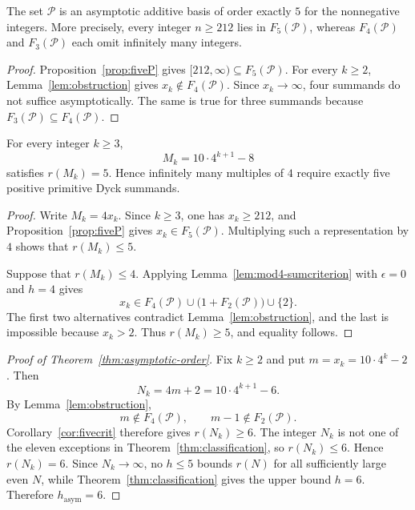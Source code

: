 \documentclass{ws-ijfcs}
\newcommand{\Pset}{\mathcal P}
\begin{document}
\begin{corollary}[Order of $\Pset$]\label{cor:orderfive}
The set $\Pset$ is an asymptotic additive basis of order exactly $5$ for
the nonnegative integers.  More precisely, every integer $n\geq212$ lies
in $F_5(\Pset)$, whereas $F_4(\Pset)$ and $F_3(\Pset)$ each omit
infinitely many integers.
\end{corollary}

\begin{proof}
Proposition~\ref{prop:fiveP} gives
$[212,\infty)\subseteq F_5(\Pset)$.  For every $k\geq2$,
Lemma~\ref{lem:obstruction} gives $x_k\notin F_4(\Pset)$.  Since
$x_k\to\infty$, four summands do not suffice asymptotically.  The same is
true for three summands because $F_3(\Pset)\subseteq F_4(\Pset)$.
\end{proof}

\newpage
\begin{corollary}
\label{cor:five-multiples}
For every integer $k\geq3$,
\[
 M_k=10\cdot4^{k+1}-8
\]
satisfies $r(M_k)=5$.  Hence infinitely many multiples of $4$ require
exactly five positive primitive Dyck summands.
\end{corollary}

\begin{proof}
Write $M_k=4x_k$.  Since $k\geq3$, one has $x_k\geq212$, and
Proposition~\ref{prop:fiveP} gives $x_k\in F_5(\Pset)$.  Multiplying such
a representation by $4$ shows that $r(M_k)\leq5$.

Suppose that $r(M_k)\leq4$.  Applying
Lemma~\ref{lem:mod4-sumcriterion} with $\epsilon=0$ and $h=4$ gives
\[
 x_k\in
 F_4(\Pset)
 \cup\bigl(1+F_2(\Pset)\bigr)
 \cup\{2\}.
\]
The first two alternatives contradict Lemma~\ref{lem:obstruction}, and
the last is impossible because $x_k>2$.  Thus $r(M_k)\geq5$, and equality
follows.
\end{proof}

\begin{proof}[Proof of Theorem~\ref{thm:asymptotic-order}]
Fix $k\geq2$ and put $m=x_k=10\cdot4^k-2$.  Then
\[
 N_k=4m+2=10\cdot4^{k+1}-6.
\]
By Lemma~\ref{lem:obstruction},
\[
 m\notin F_4(\Pset),
 \qquad
 m-1\notin F_2(\Pset).
\]
Corollary~\ref{cor:fivecrit} therefore gives $r(N_k)\geq6$.  The integer
$N_k$ is not one of the eleven exceptions in
Theorem~\ref{thm:classification}, so $r(N_k)\leq6$.  Hence $r(N_k)=6$.
Since $N_k\to\infty$, no $h\leq5$ bounds $r(N)$ for all sufficiently
large even $N$, while Theorem~\ref{thm:classification} gives the upper
bound $h=6$.  Therefore $h_{\mathrm{asym}}=6$.
\end{proof}
\end{document}
